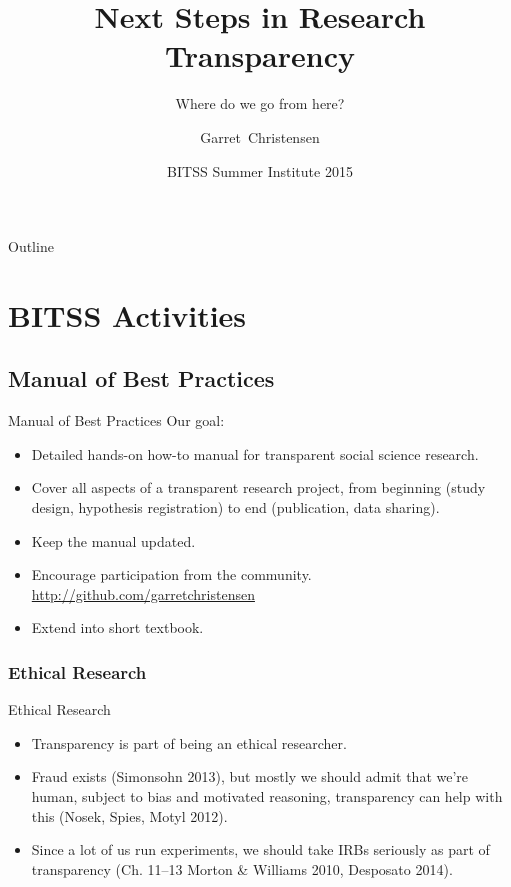 \documentclass{beamer}
\title[Next Steps in Research Transparency] %
{Next Steps in Research Transparency}
\subtitle
{Where do we go from here?}
\author[Christensen] %
{Garret~Christensen\inst{1}}
\institute[University of California Berkeley] %
{
  \inst{1}%
  Berkeley Initiative for Transparency in the Social Sciences\\
  UC Berkeley
  }
\date[BITSS2015] %
{BITSS Summer Institute 2015}
\begin{document}
\begin{frame}
  \titlepage
\end{frame}

\begin{frame}{Outline}
\tableofcontents
\end{frame}
\section{BITSS Activities}

\subsection{Manual of Best Practices}
 \begin{frame}{Manual of Best Practices}
 Our goal:
 \begin{itemize}
 \item
 Detailed hands-on how-to manual for transparent social science research. 
 \item 
 Cover all aspects of a transparent research project, from beginning (study design, hypothesis registration) to end (publication, data sharing).
 \item 
 Keep the manual updated.
 \item
 Encourage participation from the community. \url{http://github.com/garretchristensen}
 \item 
 Extend into short textbook.
 \end{itemize}
\end{frame} 
\subsubsection*{Ethical Research}
\begin{frame}{Ethical Research}
\begin{itemize}
\item
Transparency is part of being an ethical researcher. 
\item
Fraud exists (Simonsohn 2013), but mostly we should admit that we're human, subject to bias and motivated reasoning, transparency can help with this (Nosek, Spies, Motyl 2012).
\item
Since a lot of us run experiments, we should take IRBs seriously as part of transparency (Ch. 11--13 Morton \& Williams 2010, Desposato 2014). 
\end{itemize}
\end{frame}
\end{document}

